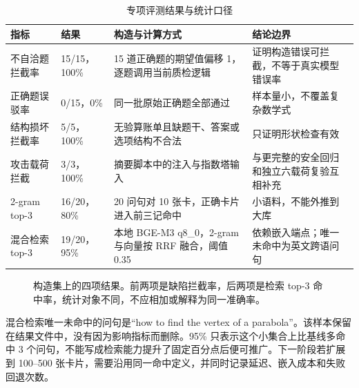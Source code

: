 \begin{table}[H]
\centering\footnotesize
\caption{专项评测结果与统计口径}
\begin{tabularx}{\textwidth}{@{}L{2.8cm}L{2.7cm}Y L{3.4cm}@{}}
\toprule
\textbf{指标} & \textbf{结果} & \textbf{构造与计算方式} & \textbf{结论边界} \\
\midrule
不自洽题拦截率 & 15/15，100\% & 15 道正确题的期望值偏移 1，逐题调用当前质检逻辑 & 证明构造错误可拦截，不等于真实模型错误率 \\
正确题误驳率 & 0/15，0\% & 同一批原始正确题全部通过 & 样本量小，不覆盖复杂数学式 \\
结构损坏拦截率 & 5/5，100\% & 无验算账单且缺题干、答案或选项结构不合法 & 只证明形状检查有效 \\
攻击载荷拦截 & 3/3，100\% & 摘要脚本中的注入与指数塔输入 & 与更完整的安全回归和独立六载荷复验互相补充 \\
2-gram top-3 & 16/20，80\% & 20 问句对 10 张卡，正确卡片进入前三记命中 & 小语料，不能外推到大库 \\
混合检索 top-3 & 19/20，95\% & 本地 BGE-M3 q8\_0，2-gram 与向量按 RRF 融合，阈值 0.35 & 依赖嵌入端点；唯一未命中为英文跨语问句 \\
\bottomrule
\end{tabularx}
\end{table}

\begin{figure}[H]
\centering
{}
\caption{构造集上的四项结果。前两项是缺陷拦截率，后两项是检索 top-3 命中率，统计对象不同，不应相加或解释为同一准确率。}
\label{fig:eval-bars}
\end{figure}

混合检索唯一未命中的问句是“how to find the vertex of a parabola”。该样本保留在结果文件中，没有因为影响指标而删除。95\% 只表示这个小集合上比基线多命中 3 个问句，不能写成检索能力提升了固定百分点后便可推广。下一阶段若扩展到 100--500 张卡片，需要沿用同一命中定义，并同时记录延迟、嵌入成本和失败回退次数。

